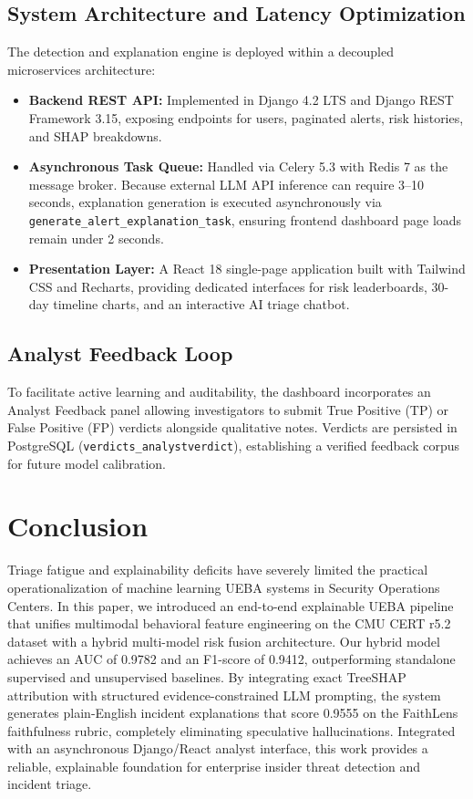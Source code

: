 \documentclass[conference]{IEEEtran}
\begin{document}
\subsection{System Architecture and Latency Optimization}
The detection and explanation engine is deployed within a decoupled microservices architecture:
\begin{itemize}
    \item \textbf{Backend REST API:} Implemented in Django 4.2 LTS and Django REST Framework 3.15, exposing endpoints for users, paginated alerts, risk histories, and SHAP breakdowns.
    \item \textbf{Asynchronous Task Queue:} Handled via Celery 5.3 with Redis 7 as the message broker. Because external LLM API inference can require 3--10 seconds, explanation generation is executed asynchronously via \texttt{generate\_alert\_explanation\_task}, ensuring frontend dashboard page loads remain under 2 seconds.
    \item \textbf{Presentation Layer:} A React 18 single-page application built with Tailwind CSS and Recharts, providing dedicated interfaces for risk leaderboards, 30-day timeline charts, and an interactive AI triage chatbot.
\end{itemize}

\subsection{Analyst Feedback Loop}
To facilitate active learning and auditability, the dashboard incorporates an Analyst Feedback panel allowing investigators to submit True Positive (TP) or False Positive (FP) verdicts alongside qualitative notes. Verdicts are persisted in PostgreSQL (\texttt{verdicts\_analystverdict}), establishing a verified feedback corpus for future model calibration.

\section{Conclusion}
\label{sec:conclusion}
Triage fatigue and explainability deficits have severely limited the practical operationalization of machine learning UEBA systems in Security Operations Centers. In this paper, we introduced an end-to-end explainable UEBA pipeline that unifies multimodal behavioral feature engineering on the CMU CERT r5.2 dataset with a hybrid multi-model risk fusion architecture. Our hybrid model achieves an AUC of 0.9782 and an F1-score of 0.9412, outperforming standalone supervised and unsupervised baselines. By integrating exact TreeSHAP attribution with structured evidence-constrained LLM prompting, the system generates plain-English incident explanations that score 0.9555 on the FaithLens faithfulness rubric, completely eliminating speculative hallucinations. Integrated with an asynchronous Django/React analyst interface, this work provides a reliable, explainable foundation for enterprise insider threat detection and incident triage.



\end{document}
